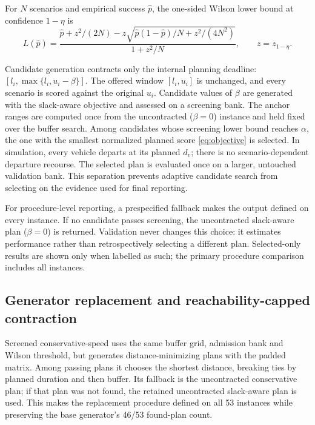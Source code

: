 \documentclass[11pt,a4paper]{article}
\begin{document}
For $N$ scenarios and empirical success $\hat p$, the one-sided Wilson lower
bound at confidence $1-\eta$ is
\begin{equation}
 L(\hat p)=
 \frac{\hat p+z^2/(2N)-z\sqrt{\hat p(1-\hat p)/N+z^2/(4N^2)}}
 {1+z^2/N},\qquad z=z_{1-\eta}.                             \label{eq:wilson}
\end{equation}

Candidate generation contracts only the internal planning deadline:
$[l_i,\max\{l_i,u_i-\beta\}]$. The offered window $[l_i,u_i]$ is unchanged, and every
scenario is scored against the original $u_i$. Candidate values of $\beta$ are
generated with the slack-aware objective and assessed on a screening bank. The
anchor ranges are computed once from the uncontracted ($\beta=0$) instance and
held fixed over the buffer search. Among candidates whose screening lower bound
reaches $\alpha$, the one with the smallest normalized planned score
\eqref{eq:objective} is selected. In simulation, every vehicle departs at its
planned $d_v$; there is no scenario-dependent departure recourse. The selected
plan is evaluated once on a larger, untouched validation bank. This separation
prevents adaptive candidate search from selecting on the evidence used for
final reporting.

For procedure-level reporting, a prespecified fallback makes the output defined
on every instance. If no candidate passes screening, the uncontracted
slack-aware plan ($\beta=0$) is returned. Validation never changes this choice:
it estimates performance rather than retrospectively selecting a different
plan. Selected-only results are shown only when labelled as such; the primary
procedure comparison includes all instances.

\subsection{Generator replacement and reachability-capped contraction}

Screened conservative-speed uses the same buffer grid, admission bank and
Wilson threshold, but generates distance-minimizing plans with the padded
matrix. Among passing plans it chooses the shortest distance, breaking ties by
planned duration and then buffer. Its fallback is the uncontracted
conservative plan; if that plan was not found, the retained uncontracted
slack-aware plan is used. This makes the replacement procedure defined on all
53 instances while preserving the base generator's 46/53 found-plan count.
\end{document}
